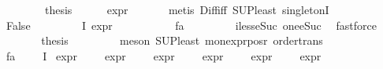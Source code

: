 \begin{isabellebody}
\ \ \isamarkupfalse%
\isanewline
\ \ \isamarkupfalse%
\ \isamarkupfalse%
\ {\isacharquery}{\kern0pt}thesis\isanewline
\ \ \ \ \isamarkupfalse%
\ expr{\isacharunderscore}{\kern0pt}{\isasympsi}\ \isanewline
\ \ \ \ \isamarkupfalse%
\ {\isacharparenleft}{\kern0pt}metis\ Diff{\isacharunderscore}{\kern0pt}iff\ SUP{\isacharunderscore}{\kern0pt}least\ singletonI{\isacharparenright}{\kern0pt}\isanewline
\ \ \isamarkupfalse%
\isanewline
\ \ \ \ \isamarkupfalse%
\ False\isanewline
\ \ \ \ \isamarkupfalse%
\ {\isachardoublequoteopen}{\isasymforall}{\isasympsi}\ {\isasymin}{\isacharparenleft}{\kern0pt}{\isasymPhi}\ {\isacharbackquote}{\kern0pt}\ I{\isacharparenright}{\kern0pt}{\isachardot}{\kern0pt}\ expr{\isacharunderscore}{\kern0pt}{}\ {\isasympsi}\ {\isasymle}\ {}{\isachardoublequoteclose}\isanewline
\ \ \ \ \ \ \isamarkupfalse%
\ fa{\isacharunderscore}{\kern0pt}{\isasympsi}\ \isanewline
\ \ \ \ \ \ \isamarkupfalse%
\ iless{\isacharunderscore}{\kern0pt}eSuc{}\ one{\isacharunderscore}{\kern0pt}eSuc\ \isamarkupfalse%
\ fastforce\isanewline
\ \ \ \ \isamarkupfalse%
\ \isamarkupfalse%
\ {\isacharquery}{\kern0pt}thesis\ \isanewline
\ \ \ \ \ \ \isamarkupfalse%
\ {\isacharparenleft}{\kern0pt}meson\ SUP{\isacharunderscore}{\kern0pt}least\ mon{\isacharunderscore}{\kern0pt}expr{\isacharunderscore}{\kern0pt}{}{\isacharunderscore}{\kern0pt}pos{\isacharunderscore}{\kern0pt}r\ order{\isachardot}{\kern0pt}trans{\isacharparenright}{\kern0pt}\isanewline
\ \ \isamarkupfalse%
\isanewline
\isanewline
\ \ \isamarkupfalse%
\ fa{\isacharunderscore}{\kern0pt}{\isasymphi}{\isacharcolon}{\kern0pt}\ {\isachardoublequoteopen}{\isasymforall}{\isasymphi}\ {\isasymin}\ {\isasymPhi}\ {\isacharbackquote}{\kern0pt}\ I{\isachardot}{\kern0pt}\ \isanewline
expr{\isacharunderscore}{\kern0pt}{}\ {\isasymphi}\ {\isasymle}\ {}\ {\isasymand}\ expr{\isacharunderscore}{\kern0pt}{}\ {\isasymphi}\ {\isasymle}\ {\isasyminfinity}\ {\isasymand}\ expr{\isacharunderscore}{\kern0pt}{}\ {\isasymphi}\ {\isasymle}\ {}\ {\isasymand}\ expr{\isacharunderscore}{\kern0pt}{}\ {\isasymphi}\ {\isasymle}\ {}\ {\isasymand}\ expr{\isacharunderscore}{\kern0pt}{}\ {\isasymphi}\ {\isasymle}\ {}\ {\isasymand}\ expr{\isacharunderscore}{\kern0pt}{}\ {\isasymphi}\ {\isasymle}\ {}{\isachardoublequoteclose}\isanewline

\end{isabellebody}
